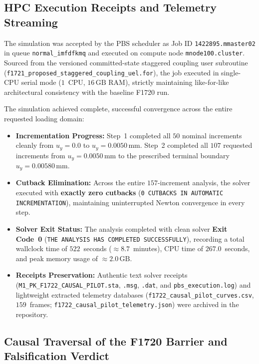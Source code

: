 \subsection{HPC Execution Receipts and Telemetry Streaming}
\label{subsec:f1722_receipts}

The simulation was accepted by the PBS scheduler as Job ID \texttt{1422895.mmaster02} in queue \texttt{normal\_imfdfkmq} and executed on compute node \texttt{mnode100.cluster}. Sourced from the versioned committed-state staggered coupling user subroutine (\texttt{f1721\_proposed\_staggered\_coupling\_uel.for}), the job executed in single-CPU serial mode ($1$~CPU, $16\,\mathrm{GB}$ RAM), strictly maintaining like-for-like architectural consistency with the baseline F1720 run.

The simulation achieved complete, successful convergence across the entire requested loading domain:
\begin{itemize}
  \item \textbf{Incrementation Progress:} Step~1 completed all $50$ nominal increments cleanly from $u_y = 0.0$ to $u_y = 0.0050\,\mathrm{mm}$. Step~2 completed all $107$ requested increments from $u_y = 0.0050\,\mathrm{mm}$ to the prescribed terminal boundary $u_y = 0.00580\,\mathrm{mm}$.
  \item \textbf{Cutback Elimination:} Across the entire $157$-increment analysis, the solver executed with \textbf{exactly zero cutbacks} (\texttt{0 CUTBACKS IN AUTOMATIC INCREMENTATION}), maintaining uninterrupted Newton convergence in every step.
  \item \textbf{Solver Exit Status:} The analysis completed with clean solver \textbf{Exit Code~0} (\texttt{THE ANALYSIS HAS COMPLETED SUCCESSFULLY}), recording a total wallclock time of $522$~seconds ($\approx 8.7$~minutes), CPU time of $267.0$~seconds, and peak memory usage of $\approx 2.0\,\mathrm{GB}$.
  \item \textbf{Receipts Preservation:} Authentic text solver receipts (\texttt{M1\_PK\_F1722\_CAUSAL\_PILOT.sta}, \texttt{.msg}, \texttt{.dat}, and \texttt{pbs\_execution.log}) and lightweight extracted telemetry databases (\texttt{f1722\_causal\_pilot\_curves.csv}, $159$~frames; \texttt{f1722\_causal\_pilot\_telemetry.json}) were archived in the repository.
\end{itemize}

\subsection{Causal Traversal of the F1720 Barrier and Falsification Verdict}
\label{subsec:f1722_falsification}

